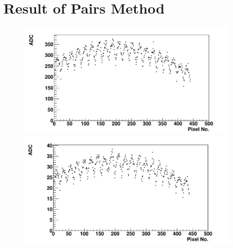 \section{Result of Pairs Method}

\begin{figure} %
\includegraphics[width=\textwidth]{chapters/graphs/GainVarsMeas/LL_m04_2016-06-11/Set0and2/meanHist_StandHV_Pairs_set0and2.pdf}
\caption{}
\vspace{3mm}
\includegraphics[width=\textwidth]{chapters/graphs/GainVarsMeas/LL_m04_2016-06-11/Set0and2/meanHist_LowHV_Pairs_set0and2.pdf}
\caption{}
\end{figure}

